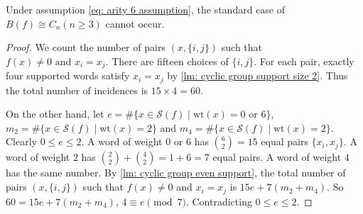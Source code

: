 \begin{lemma}\label{lm: cyclic group impossible}
    Under assumption \eqref{eq: arity 6 assumption}, the standard case of $B(f)\cong C_n (n\ge 3)$ cannot occur.
\end{lemma}
\begin{proof}
    We count the number of pairs \((x,\{i,j\})\) such that $f(x)\ne0\text{ and }x_i=x_j.$
    There are fifteen choices of \(\{i,j\}\).
    For each pair, exactly four supported words satisfy $x_i=x_j$ by \cref{lm: cyclic group support size 2}.
    Thus the total number of incidences is
    $15\times4=60.$

    On the other hand,
    let \(e=\#\{x\in \mathscr{S}(f)\mid \mathrm{wt}(x)=0  \text{ or } 6\}\),
    \(m_2=\#\{x\in \mathscr{S}(f)\mid \mathrm{wt}(x)=2\}\) and \(m_4=\#\{x\in \mathscr{S}(f)\mid \mathrm{wt}(x)=2\}\). 
    Clearly
    $0\le e\le2.$
    A word of weight \(0\) or \(6\) has $\binom{6}{2}=15$ equal pairs $\{x_i,x_j\}$.
    A word of weight \(2\) has $\binom22+\binom42=1+6=7$ equal pairs. 
    A word of weight \(4\) has the same number.
    By \cref{lm: cyclic group even support}, the total number of pairs $(x,\{i,j\})$ such that $f(x)\neq 0$ and $x_i=x_j$ is
    $15e+7(m_2+m_4).$
    So $60=15e+7(m_2+m_4)$,
    $4\equiv e\pmod7.$
    Contradicting $0\le e\le 2.$
\end{proof}

